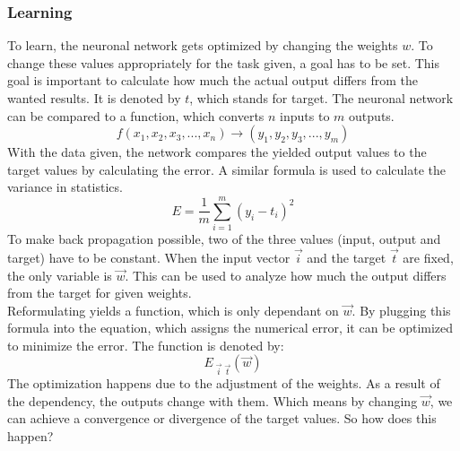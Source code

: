 \documentclass[12pt]{article}
\begin{document}
\subsubsection{Learning}\label{learning}
To learn, the \gls{neuronal network} gets optimized by changing the \glspl{weight} $w$. To change these values appropriately for the task given, a goal has to be set. This goal is important to calculate how much the actual output differs from the wanted results. It is denoted by $t$, which stands for \gls{target}. The \gls{neuronal network} can be compared to a function, which converts $n$ \glspl{input} to $m$ \glspl{output}.
\begin{equation}
    f(x_{1},x_{2},x_{3},...,x_{n}) \rightarrow (y_{1},y_{2},y_{3},...,y_{m})
\end{equation}
With the data given, the network compares the yielded \gls{output} values to the target values by calculating the error. A similar formula is used to calculate the variance in statistics.
\begin{equation}
   E = \frac{1}{m}\sum_{i=1}^{m}\left ( y_{i}- t_{i} \right )^{2}
\end{equation}
To make \gls{back propagation} possible, two of the three values (\gls{input}, \gls{output} and \gls{target}) have to be constant. When the \gls{input} \gls{vector} $\vec{i}$ and the target $\vec{t}$ are fixed, the only variable is $\vec{w}$. This can be used to analyze how much the \gls{output} differs from the \gls{target} for given \glspl{weight}. \\
Reformulating yields a function, which is only dependant on $\vec{w}$. By plugging this formula into the equation, which assigns the numerical error, it can be optimized to minimize the error. The function is denoted by:
\begin{equation}
E_{\;\vec{i}\;\vec{t}}(\vec{w})
\end{equation}
The \gls{optimization} happens due to the adjustment of the \glspl{weight}. As a result of the dependency, the \glspl{output} change with them. Which means by changing $\vec{w}$, we can achieve a \gls{convergence} or \gls{divergence} of the target values. So how does this happen?
\end{document}
